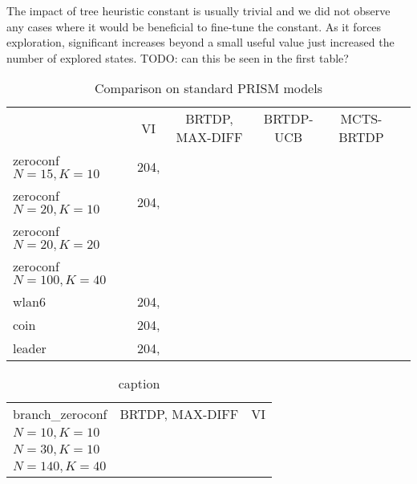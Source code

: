 The impact of tree heuristic constant is usually trivial and we did not
observe any cases where it would be beneficial to fine-tune the
constant. As it forces exploration, significant increases beyond a small
useful value just increased the number of explored states. TODO: can
this be seen in the first table?

\begin{landscape}

\begin{table}
\begin{tabularx}{\textwidth}{ l  | c | c | c | c | c }
                     & VI     &  BRTDP, MAX-DIFF   & BRTDP-UCB & MCTS-BRTDP \\
zeroconf $N=15,  K=10$ &        204, &   \\
zeroconf $N=20,  K=10$ &        204, &   \\
zeroconf $N=20, K=20$  &   &   \\
zeroconf $N=100, K=40$ &   &   \\
wlan6                &        204, &   \\
coin                 &        204, &   \\
leader               &        204, &   \\
\end{tabularx}
\caption{Comparison on standard PRISM models}
\label{table:general_comparison}
\end{table}

\begin{table}
\begin{tabularx}{\textwidth}{ l  | c | c  }
branch\_zeroconf &  BRTDP, MAX-DIFF   &   VI      \\
$N=10,  K=10$ & \\
$N=30,  K=10$ & \\
$N=140, K=40$ &

\end{tabularx}
\caption{caption}
\label{table:branch_zconf}
\end{table}

\end{landscape}

